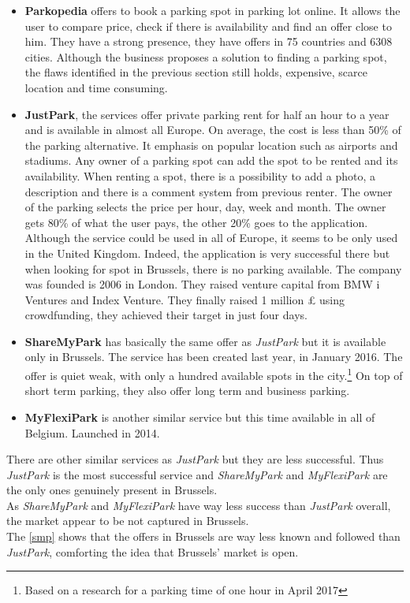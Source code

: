 \documentclass[12pt,a4paper,oneside]{book}
\begin{document}
\begin{itemize}
\item \textbf{Parkopedia} offers to book a parking spot in parking lot online. It allows the user to compare price, check if there is availability and find an offer close to him. They have a strong presence, they have offers in 75 countries and 6308 cities. Although the business proposes a solution to finding a parking spot, the flaws identified in the previous section still holds, expensive, scarce location and time consuming.
\item \textbf{JustPark}, the services offer private parking rent for half an hour to a year and is available in almost all Europe. On average, the cost is less than 50\% of the parking alternative. It emphasis on popular location such as airports and stadiums. Any owner of a parking spot can add the spot to be rented and its availability. When renting a spot, there is a possibility to add a photo, a description and there is a comment system from previous renter. The owner of the parking selects the price per hour, day, week and month. The owner gets 80\% of what the user pays, the other 20\% goes to the application. Although the service could be used in all of Europe, it seems to be only used in the United Kingdom. Indeed, the application is very successful there but when looking for spot in Brussels, there is no parking available. The company was founded is 2006 in London. They raised venture capital from BMW i Ventures\cite{bmwi} and Index Venture.\cite{iven} They finally raised 1 million £ using crowdfunding, they achieved their target in just four days.\cite{crowd}
\item \textbf{ShareMyPark} has basically the same offer as \textit{JustPark} but it is available only in Brussels. The service has been created last year, in January 2016. The offer is quiet weak, with only a hundred available spots in the city.\footnote{Based on a research for a parking time of one hour in April 2017} On top of short term parking, they also offer long term and business parking.
\item \textbf{MyFlexiPark} is another similar service but this time available in all of Belgium. Launched in 2014.
\end{itemize}

There are other similar services as \textit{JustPark} but they are less successful. Thus \textit{JustPark} is the most successful service and \textit{ShareMyPark} and \textit{MyFlexiPark} are the only ones genuinely present in Brussels.\\
As \textit{ShareMyPark} and \textit{MyFlexiPark} have way less success than \textit{JustPark} overall, the market appear to be not captured in Brussels.\\
The \autoref{smp} shows that the offers in Brussels are way less known and followed than \textit{JustPark}, comforting the idea that Brussels' market is open.
\end{document}
